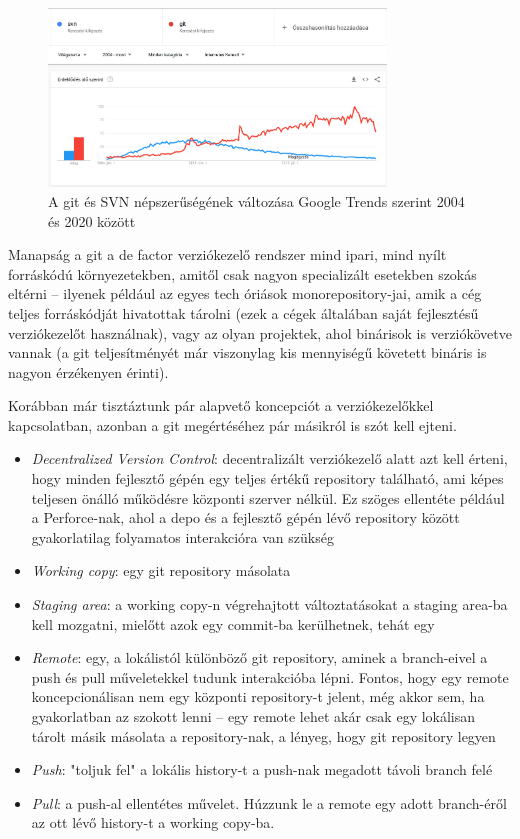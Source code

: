 \begin{figure}[H]
    \centering
    \includegraphics[width=0.8\textwidth]{images/gitsvn.png}
    \caption{A git és SVN népszerűségének változása Google Trends szerint 2004 és 2020 között}
    \label{fig:git-svn-trends}
\end{figure}


Manapság a git a de factor verziókezelő rendszer mind ipari, mind nyílt forráskódú környezetekben, amitől csak nagyon specializált esetekben szokás eltérni -- ilyenek például az egyes tech óriások monorepository-jai, amik a cég teljes forráskódját hivatottak tárolni (ezek a cégek általában saját fejlesztésű verziókezelőt használnak), vagy az olyan projektek, ahol binárisok is verziókövetve vannak (a git teljesítményét már viszonylag kis mennyiségű követett bináris is nagyon érzékenyen érinti).

Korábban már tisztáztunk pár alapvető koncepciót a verziókezelőkkel kapcsolatban, azonban a git megértéséhez pár másikról is szót kell ejteni.

\begin{itemize}
    \item \textit{Decentralized Version Control}: decentralizált verziókezelő alatt azt kell érteni, hogy minden fejlesztő gépén egy teljes értékű repository található, ami képes teljesen önálló működésre központi szerver nélkül. Ez szöges ellentéte például a Perforce-nak, ahol a depo és a fejlesztő gépén lévő repository között gyakorlatilag folyamatos interakcióra van szükség
    \item \textit{Working copy}: egy git repository másolata
    \item \textit{Staging area}: a working copy-n végrehajtott változtatásokat a staging area-ba kell mozgatni, mielőtt azok egy commit-ba kerülhetnek, tehát egy
    \item \textit{Remote}: egy, a lokálistól különböző git repository, aminek a branch-eivel a push és pull műveletekkel tudunk interakcióba lépni. Fontos, hogy egy remote koncepcionálisan nem egy központi repository-t jelent, még akkor sem, ha gyakorlatban az szokott lenni -- egy remote lehet akár csak egy lokálisan tárolt másik másolata a repository-nak, a lényeg, hogy git repository legyen
    \item \textit{Push}: "toljuk fel" a lokális history-t a push-nak megadott távoli branch felé
    \item \textit{Pull}: a push-al ellentétes művelet. Húzzunk le a remote egy adott branch-éről az ott lévő history-t a working copy-ba.
\end{itemize}

